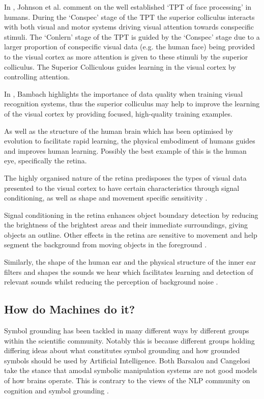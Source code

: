 In \cite{johnson2015two}, Johnson et al. comment on the well established `\ac{TPT} of face processing' in humans.  During the `Conspec' stage of the \ac{TPT} the superior colliculus interacts with both visual and motor systems driving visual attention towards conspecific stimuli. The `Conlern' stage of the \ac{TPT} is guided by the `Conspec' stage due to a larger proportion of conspecific visual data  (e.g. the human face) being provided to the visual cortex as more attention is given to these stimuli by the superior colliculus. 
The Superior Colliculous guides learning in the visual cortex by controlling attention.

In \cite{bambach2017egocentric}, Bambach highlights the importance of data quality when training visual recognition systems, thus the superior colliculus may help to improve the learning of the visual cortex by providing focused, high-quality training examples.

As well as the structure of the human brain which has been optimised by evolution to facilitate rapid learning, the physical embodiment of humans guides and improves human learning. Possibly the best example of this is the human eye, specifically the retina.

The highly organised nature of the retina predisposes the types of visual data presented to the visual cortex to have certain characteristics through signal conditioning, as well as shape and movement specific sensitivity \cite{masland2012neuronal}.

Signal conditioning in the retina enhances object boundary detection by reducing the brightness of the brightest areas and their immediate surroundings, giving objects an outline. Other effects in the retina are sensitive to movement and help segment the background from moving objects in the foreground \cite{olveczky2003segregation}.

Similarly, the shape of the human ear and the physical structure of the inner ear filters and shapes the sounds we hear which facilitates learning and detection of relevant sounds whilst reducing the perception of background noise \cite{oxenham2018we}.

\subsection{How do Machines do it?}
Symbol grounding has been tackled in many different ways by different groups within the scientific community. Notably this is because different groups holding differing ideas about what constitutes symbol grounding and how grounded symbols should be used by Artificial Intelligence. Both Barsalou \cite{barsalou2008grounded} and Cangelosi \cite{cangelosi2000robotic} take the stance that amodal symbolic manipulation systems are not good models of how brains operate. This is contrary to the views of the \ac{NLP} community on cognition and symbol grounding \cite{lemonlearning, yu2017learning}.


